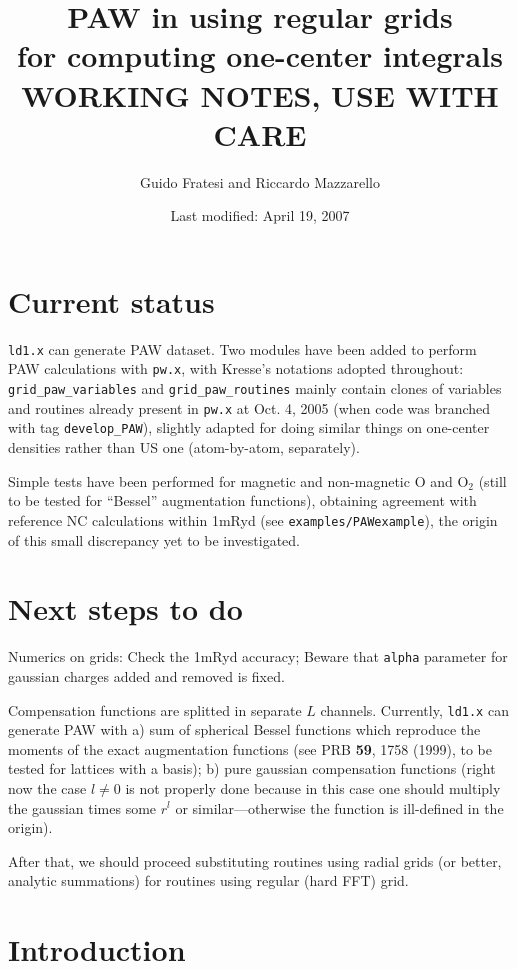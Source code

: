 \documentclass[a4paper,twocolumn,12pt]{article}
\title{PAW in \var{pw.x} using regular grids\\for computing one-center
integrals\\WORKING NOTES, USE WITH CARE}
\author{Guido Fratesi and Riccardo Mazzarello}
\date{Last modified: April 19, 2007}
\newcommand{\var}[1]{{\tt #1}}
\begin{document}
\maketitle

\section*{Current status}

\var{ld1.x} can generate PAW dataset.  Two modules have been added to
perform PAW calculations with \var{pw.x}, with Kresse's notations
adopted throughout: \var{grid\_paw\_variables} and
\var{grid\_paw\_routines} mainly contain clones of variables and
routines already present in \var{pw.x} at Oct. 4, 2005 (when code was
branched with tag \var{develop\_PAW}), slightly adapted for doing
similar things on one-center densities rather than US one
(atom-by-atom, separately).

Simple tests have been performed for magnetic and non-magnetic O and O$_2$
(still to be tested for ``Bessel'' augmentation functions),
obtaining agreement with reference NC calculations within 1mRyd (see
\var{examples/PAWexample}), the origin of this small discrepancy yet
to be investigated.

\section*{Next steps to do}

Numerics on grids: Check the 1mRyd accuracy; Beware that \var{alpha}
parameter for gaussian charges added and removed is fixed.

Compensation functions are splitted in separate $L$ channels.  
Currently, \var{ld1.x} can generate PAW with
a) sum of spherical Bessel functions which reproduce the moments of the 
exact augmentation functions (see PRB {\bf 59}, 1758 (1999), to be tested
for lattices with a basis); b) pure gaussian compensation functions 
(right now the case $l\neq0$ is not properly done because in this case 
one should multiply the gaussian times some $r^l$ or similar---otherwise 
the function is ill-defined in the origin).

After that, we should proceed substituting routines using radial grids
(or better, analytic summations) for routines using regular (hard FFT)
grid.

\section*{Introduction}
\end{document}
